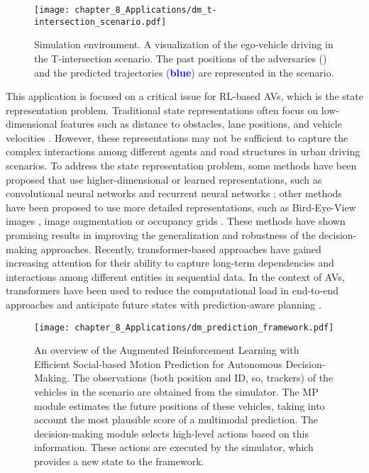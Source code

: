 \begin{figure}[h]
	\centering
	\texttt{[image: chapter\_8\_Applications/dm\_t-intersection\_scenario.pdf]}
	\captionsetup{justification=justified}
	\caption{Simulation environment. A visualization of the ego-vehicle driving in the T-intersection scenario. The past positions of the adversaries (\textbf{\color{YellowOrange}{yellow}}) and the predicted trajectories (\textbf{\textcolor{blue}{blue}}) are represented in the scenario.}
	\label{fig:chapter_8_Applications/dm_t-intersection_scenario}
\end{figure}

This application is focused on a critical issue for RL-based AVs, which is the state representation problem. Traditional state representations often focus on low-dimensional features such as distance to obstacles, lane positions, and vehicle velocities \cite{Rodrigo2023}. However, these representations may not be sufficient to capture the complex interactions among different agents and road structures in urban driving scenarios. To address the state representation problem, some methods have been proposed that use higher-dimensional or learned representations, such as convolutional neural networks \cite{Johan2018} and recurrent neural networks \cite{Tram2018}; other methods have been proposed to use more detailed representations, such as  Bird-Eye-View images \cite{zhang2021endtoend}, image augmentation \cite{kostrikov2021image} or occupancy grids \cite{moghadam2019hierarchical}. These methods have shown promising results in improving the generalization and robustness of the decision-making approaches. Recently, transformer-based approaches have gained increasing attention for their ability to capture long-term dependencies and interactions among different entities in sequential data. In the context of AVs, transformers have been used to reduce the computational load in end-to-end approaches \cite{Li4} and anticipate future states with prediction-aware planning \cite{valiente2022predictionaware}.

\begin{figure}[h]
	\centering        
	\texttt{[image: chapter\_8\_Applications/dm\_prediction\_framework.pdf]}
	\captionsetup{justification=justified}
	\caption{An overview of the Augmented Reinforcement Learning with Efficient Social-based Motion Prediction for Autonomous Decision-Making. The observations (both position and ID, so, trackers) of the vehicles in the scenario are obtained from the simulator. The MP module estimates the future positions of these vehicles, taking into account the most plausible score of a multimodal prediction. The decision-making module selects high-level actions based on this information. These actions are executed by the simulator, which provides a new state to the framework. }
	\label{fig:chapter_8_Applications/dm_prediction_framework}
\end{figure}

